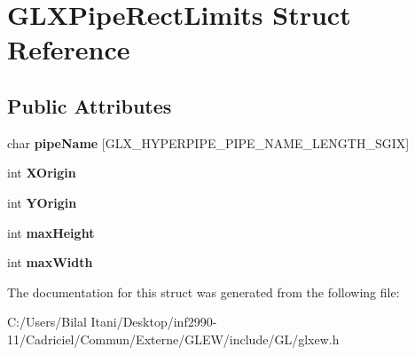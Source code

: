\hypertarget{struct_g_l_x_pipe_rect_limits}{}\section{G\+L\+X\+Pipe\+Rect\+Limits Struct Reference}
\label{struct_g_l_x_pipe_rect_limits}
\subsection*{Public Attributes}
\begin{DoxyCompactItemize}
\item 
char {\bfseries pipe\+Name} \mbox{[}G\+L\+X\+\_\+\+H\+Y\+P\+E\+R\+P\+I\+P\+E\+\_\+\+P\+I\+P\+E\+\_\+\+N\+A\+M\+E\+\_\+\+L\+E\+N\+G\+T\+H\+\_\+\+S\+G\+IX\mbox{]}\hypertarget{struct_g_l_x_pipe_rect_limits_ae78b4b6656101bc841946733a5b6e5ce}{}\label{struct_g_l_x_pipe_rect_limits_ae78b4b6656101bc841946733a5b6e5ce}

\item 
int {\bfseries X\+Origin}\hypertarget{struct_g_l_x_pipe_rect_limits_a3e5a965059d9f5d2ca42acd35af5bb9b}{}\label{struct_g_l_x_pipe_rect_limits_a3e5a965059d9f5d2ca42acd35af5bb9b}

\item 
int {\bfseries Y\+Origin}\hypertarget{struct_g_l_x_pipe_rect_limits_a50e06bcf0dae95854be7d93a515199e9}{}\label{struct_g_l_x_pipe_rect_limits_a50e06bcf0dae95854be7d93a515199e9}

\item 
int {\bfseries max\+Height}\hypertarget{struct_g_l_x_pipe_rect_limits_a27572e499c0d3280031c2ad8e387c0c1}{}\label{struct_g_l_x_pipe_rect_limits_a27572e499c0d3280031c2ad8e387c0c1}

\item 
int {\bfseries max\+Width}\hypertarget{struct_g_l_x_pipe_rect_limits_a8662c7a712b30620e25fc994adf337a1}{}\label{struct_g_l_x_pipe_rect_limits_a8662c7a712b30620e25fc994adf337a1}

\end{DoxyCompactItemize}


The documentation for this struct was generated from the following file\+:\begin{DoxyCompactItemize}
\item 
C\+:/\+Users/\+Bilal Itani/\+Desktop/inf2990-\/11/\+Cadriciel/\+Commun/\+Externe/\+G\+L\+E\+W/include/\+G\+L/glxew.\+h\end{DoxyCompactItemize}

